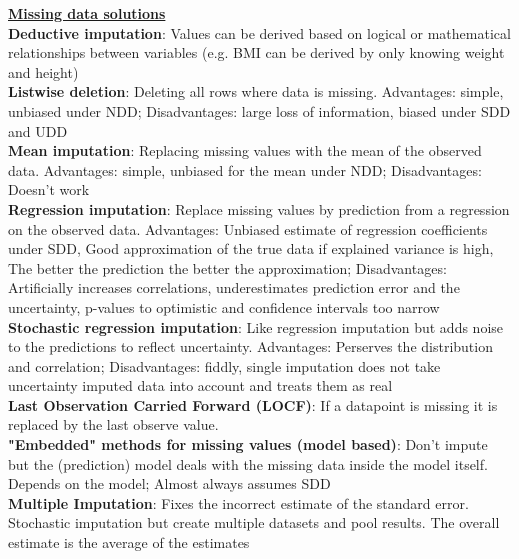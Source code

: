 \documentclass[a4paper,7pt,landscape]{extarticle}
\begin{document}
\begin{multicols}{3}
\begin{boxA}
\underline{\textbf{Missing data solutions}}\\
\textbf{Deductive imputation}: Values can be derived based on logical or mathematical relationships between variables (e.g. BMI can be derived by only knowing weight and height)\\
\textbf{Listwise deletion}: Deleting all rows where data is missing. Advantages: simple, unbiased under NDD; Disadvantages: large loss of information, biased under SDD and UDD\\
\textbf{Mean imputation}: Replacing missing values with the mean of the observed data. Advantages: simple, unbiased for the mean under NDD; Disadvantages: Doesn't work\\
\textbf{Regression imputation}: Replace missing values by prediction from a regression on the observed data. Advantages: Unbiased estimate of regression coefficients under SDD, Good approximation of the true data if explained variance is high, The better the prediction the better the approximation; Disadvantages: Artificially increases correlations, underestimates prediction error and the uncertainty, p-values to optimistic and confidence intervals too narrow\\
\textbf{Stochastic regression imputation}: Like regression imputation but adds noise to the predictions to reflect uncertainty. Advantages: Perserves the distribution and correlation; Disadvantages: fiddly, single imputation does not take uncertainty imputed data into account and treats them as real\\
\textbf{Last Observation Carried Forward (LOCF)}: If a datapoint is missing it is replaced by the last observe value.\\
\textbf{"Embedded" methods for missing values (model based)}: Don't impute but the (prediction) model deals with the missing data inside the model itself. Depends on the model; Almost always assumes SDD\\
\textbf{Multiple Imputation}: Fixes the incorrect estimate of the standard error. Stochastic imputation but create multiple datasets and pool results. The overall estimate is the average of the estimates
\end{boxA}



\end{multicols}
\end{document}
